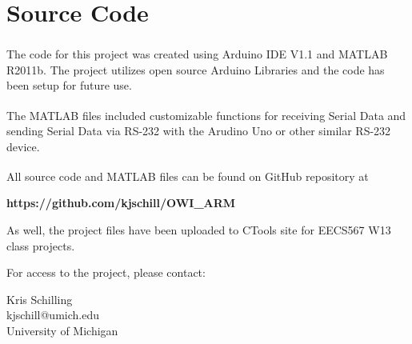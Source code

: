 \documentclass[paper=letter, fontsize=10pt]{scrartcl}	%
\numberwithin{equation}{section}															%
\numberwithin{figure}{section}																%
\numberwithin{table}{section}																%
\begin{document}
\section{\\Source Code} \label{App:AppendixC}

The code for this project was created using Arduino IDE V1.1 and MATLAB\textsuperscript{\textregistered} R2011b. The project utilizes open source Arduino Libraries and the code has been setup for future use.

The MATLAB\textsuperscript{\textregistered} files included customizable functions for receiving Serial Data and sending Serial Data via RS-232 with the Arudino Uno or other similar RS-232 device.

All source code and MATLAB\textsuperscript{\textregistered} files can be found on GitHub repository at

\begin{center}
\textbf{https://github.com/kjschill/OWI\_ARM}
\end{center}

As well, the project files have been uploaded to CTools site for EECS567 W13 class projects.

For access to the project, please contact:
\begin{center}
Kris Schilling
\\kjschill@umich.edu
\\University of Michigan
\end{center}
\end{document}
